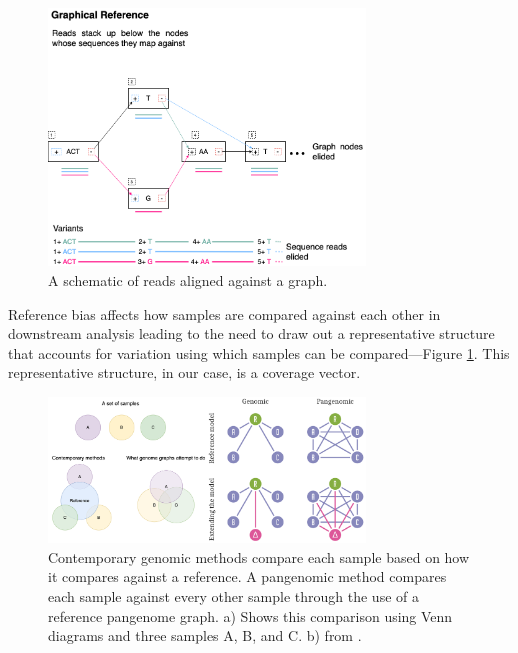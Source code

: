 \documentclass[10pt, a4paper]{article}
\begin{document}
\begin{figure}[htbp]
\centering
\includegraphics[width=0.75\textwidth]{../Figures/Alignment-graph-schematic.png}
\caption[Read alignment against a graph-based reference]{\label{fig:org3c5ee69}A schematic of reads aligned against a graph.}
\end{figure}


Reference bias affects how samples are compared against each other in downstream
analysis leading to the need to draw out a representative structure that
accounts for variation using which samples can be compared—Figure
\ref{fig:org3c5ee69}.
This representative structure, in our case, is a coverage vector.

\begin{figure}[htbp]
\centering
\includegraphics[width=0.75\textwidth]{../Figures/combined-all-vs-all.png}
\caption[Graphical all vs all comparison]{\label{fig:orge9a24b3}Contemporary genomic methods compare each sample based on how it compares against a reference. A pangenomic method compares each sample against every other sample through the use of a reference pangenome graph. a) Shows this comparison using Venn diagrams and three samples A, B, and C. b) from \cite{eizengaSuccinctDynamicVariation2020}.}
\end{figure}
\end{document}
